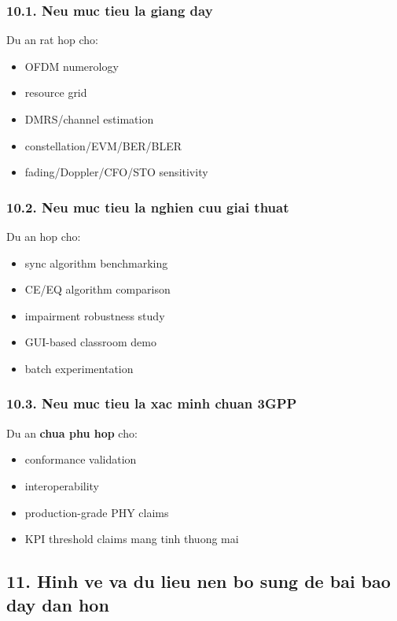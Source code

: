 \documentclass[
  vietnamese,
  a4paper,
  11pt]{article}
\providecommand{\tightlist}{%
  \setlength{\itemsep}{0pt}\setlength{\parskip}{0pt}}
\begin{document}
\subsubsection{10.1. Neu muc tieu la giang
day}\label{neu-muc-tieu-la-giang-day}

Du an rat hop cho:

\begin{itemize}
\tightlist
\item
  OFDM numerology
\item
  resource grid
\item
  DMRS/channel estimation
\item
  constellation/EVM/BER/BLER
\item
  fading/Doppler/CFO/STO sensitivity
\end{itemize}

\subsubsection{10.2. Neu muc tieu la nghien cuu giai
thuat}\label{neu-muc-tieu-la-nghien-cuu-giai-thuat}

Du an hop cho:

\begin{itemize}
\tightlist
\item
  sync algorithm benchmarking
\item
  CE/EQ algorithm comparison
\item
  impairment robustness study
\item
  GUI-based classroom demo
\item
  batch experimentation
\end{itemize}

\subsubsection{10.3. Neu muc tieu la xac minh chuan
3GPP}\label{neu-muc-tieu-la-xac-minh-chuan-3gpp}

Du an \textbf{chua phu hop} cho:

\begin{itemize}
\tightlist
\item
  conformance validation
\item
  interoperability
\item
  production-grade PHY claims
\item
  KPI threshold claims mang tinh thuong mai
\end{itemize}

\subsection{11. Hinh ve va du lieu nen bo sung de bai bao day dan
hon}\label{hinh-ve-va-du-lieu-nen-bo-sung-de-bai-bao-day-dan-hon}
\end{document}
